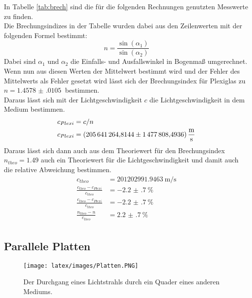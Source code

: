 \noindent In Tabelle \ref{tab:brech} sind die für die folgenden Rechnungen genutzten Messwerte zu finden.\\
Die Brechungsindizes in der Tabelle wurden dabei aus den Zeilenwerten mit der folgenden Formel bestimmt:
\begin{equation*}
    n=\frac{\sin(\alpha_1)}{\sin(\alpha_2)}
\end{equation*}
Dabei sind $\alpha_1$ und $\alpha_2$ die Einfalls- und Ausfallswinkel in Bogenmaß umgerechnet.
Wenn nun aus diesen Werten der Mittelwert bestimmt wird und der Fehler des Mittelwerts als Fehler gesetzt 
wird lässt sich der Brechungsindex für Plexiglas zu $n= \SI{1.4578(0105)}{}$ bestimmen.\\
Daraus lässt sich mit der Lichtgeschwindigkeit $c$\cite{c} die Lichtgeschwindigkeit in dem Medium bestimmen.
\begin{align*}
    c_{Plexi}&=c/n \\
    c_{Plexi}&= \SI{205641264.8144 (14778084936)}{\metre\per\second}
\end{align*}
Daraus lässt sich dann auch aus dem Theoriewert für den Brechungsindex $n_{theo}=1.49$\cite{n} auch ein Theoriewert für die Lichtgeschwindigkeit und damit auch die relative Abweichung bestimmen.
\begin{align*}
    c_{theo}&=\SI{201202991.9463}{\metre\per\second}\\
    \frac{c_{theo}-c_{Plexi}}{c_{theo}}&=\SI{-2.2(7)}{\percent}\\
    \frac{c_{theo}-c_{Plexi}}{c_{theo}}&=\SI{-2.2(7)}{\percent}\\
    \frac{n_{theo}-n}{c_{theo}}&=\SI{2.2(7)}{\percent}\\
\end{align*}

\subsection{Parallele Platten}

\begin{figure}[h]
    \centering
    \texttt{[image: latex/images/Platten.PNG]}
    \caption{Der Durchgang eines Lichtstrahls durch ein Quader eines anderen Mediums.}
    \label{img:platt}
\end{figure}

